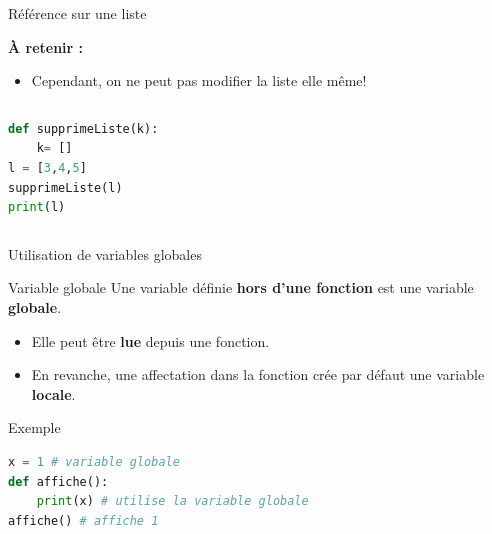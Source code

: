 \documentclass[10pt, xcolor={svgnames}]{beamer}
\begin{document}
\begin{frame}[fragile]{Référence sur une liste}
	\begin{block}{}
	\textbf{\`A retenir :}
	\begin{itemize}
		\item Cependant, on ne peut pas modifier la liste elle même! 
	\end{itemize}
	\end{block}
	\vspace{0.5 cm}
	
	
	\begin{columns}
		\column{5 cm}
		\begin{exampleblock}{}
			\begin{lstlisting}[language=Python]
def supprimeListe(k):
	k= []
l = [3,4,5]
supprimeListe(l)
print(l)
			\end{lstlisting}		
		\end{exampleblock}
		\column{4 cm}
	\end{columns}
	
\end{frame}


\begin{frame}[fragile]{Utilisation de variables globales}
	
	\begin{block}{Variable globale}
		Une variable définie \textbf{hors d'une fonction} est une variable
		\textbf{globale}.
	\end{block}
	
	\vspace{0.3cm}
	
	\begin{itemize}
		\item Elle peut être \textbf{lue} depuis une fonction.
		\item En revanche, une affectation dans la fonction crée par défaut
		une variable \textbf{locale}.
	\end{itemize}
	
	\vspace{0.3cm}
	
	\begin{exampleblock}{Exemple}
		\begin{lstlisting}[language=Python]
x = 1 # variable globale
def affiche():
	print(x) # utilise la variable globale
affiche() # affiche 1
		\end{lstlisting}
	\end{exampleblock}
	
\end{frame}
\end{document}
